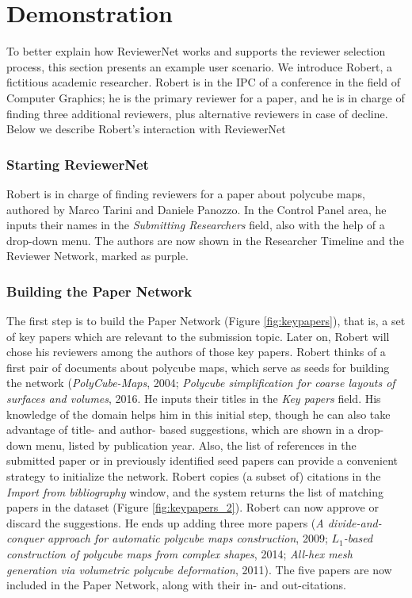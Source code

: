 \chapter{Demonstration}\label{sec:demonstration}
To better explain how ReviewerNet works and supports the reviewer selection process, this section presents an example user scenario. We introduce Robert, a fictitious academic researcher. Robert is in the IPC of a conference in the field of Computer Graphics; he is the primary reviewer for a paper, and he is in charge of finding three additional reviewers, plus alternative reviewers in case of decline. 
Below we describe Robert's interaction with ReviewerNet
\subsection*{Starting ReviewerNet}

Robert is in charge of finding reviewers for a paper about polycube maps, authored by Marco Tarini and Daniele Panozzo. In the Control Panel area, he inputs their names in the \emph{Submitting Researchers} field, also with the help of a drop-down menu. The authors are now shown in the Researcher Timeline and the Reviewer Network, marked as purple. 
\subsection*{Building the Paper Network} 
The first step is to build the Paper Network (Figure \ref{fig:keypapers}), that is, a set of key papers which are relevant to the submission topic. Later on, Robert will chose his reviewers among the authors of those key papers. Robert  thinks of a first pair of documents about polycube maps, which serve as seeds for building the network (\emph{PolyCube-Maps}, 2004; \emph{Polycube simplification for coarse layouts of surfaces and volumes}, 2016.  %
He inputs their titles in the \emph{Key papers} field. His knowledge of the domain helps him in this initial step, though he can also take advantage of title- and author- based suggestions, which are shown in a drop-down menu, listed by publication year. Also, the list of references in the submitted paper or in previously identified seed papers can provide a convenient strategy to initialize the network. Robert copies (a subset of) citations in the \emph{Import from bibliography} window, and the system returns the list of matching papers in the dataset (Figure \ref{fig:keypapers_2}). Robert can now approve or discard the suggestions. He ends up adding three more papers (\emph{A divide-and-conquer approach for automatic polycube maps construction}, 2009; \emph{$L_1$-based construction of polycube maps from complex shapes}, 2014; \emph{All-hex mesh generation via volumetric polycube deformation}, 2011). 
The five papers are now included in the Paper Network, along with their in- and out-citations. 
 
